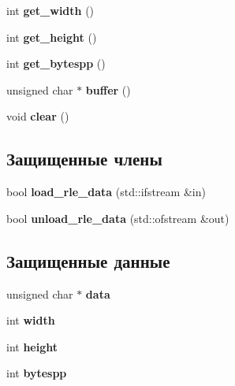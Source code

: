 \begin{DoxyCompactItemize}
\item 
\mbox{\label{classTGAImage_a7f4fc3ed4681794265dda9de40901c4c}} 
int {\bfseries get\+\_\+width} ()
\item 
\mbox{\label{classTGAImage_ace38afffc9190e587ae4131f9e8eff75}} 
int {\bfseries get\+\_\+height} ()
\item 
\mbox{\label{classTGAImage_a76fe0fa4c0f07325df8cb03b4776f6ed}} 
int {\bfseries get\+\_\+bytespp} ()
\item 
\mbox{\label{classTGAImage_aed4bdaf93999de486033d0c897882c67}} 
unsigned char $\ast$ {\bfseries buffer} ()
\item 
\mbox{\label{classTGAImage_a9aa8fa984ac190303063ce3ef794555e}} 
void {\bfseries clear} ()
\end{DoxyCompactItemize}
\subsection*{Защищенные члены}
\begin{DoxyCompactItemize}
\item 
\mbox{\label{classTGAImage_af39d7d3946ce82d0ef57fcea86a993ea}} 
bool {\bfseries load\+\_\+rle\+\_\+data} (std\+::ifstream \&in)
\item 
\mbox{\label{classTGAImage_a5fbef3f9c83b957197f23f0f1b321efc}} 
bool {\bfseries unload\+\_\+rle\+\_\+data} (std\+::ofstream \&out)
\end{DoxyCompactItemize}
\subsection*{Защищенные данные}
\begin{DoxyCompactItemize}
\item 
\mbox{\label{classTGAImage_afd06806bae721d61ae49a600ef26e6d1}} 
unsigned char $\ast$ {\bfseries data}
\item 
\mbox{\label{classTGAImage_aeff3ad848265a0963558565c4cd3ff7c}} 
int {\bfseries width}
\item 
\mbox{\label{classTGAImage_acc1d453f77bf82c48c9cef8e111a7ecf}} 
int {\bfseries height}
\item 
\mbox{\label{classTGAImage_a3bc2a6c8a3907fd7905ea3eb04271aca}} 
int {\bfseries bytespp}
\end{DoxyCompactItemize}


